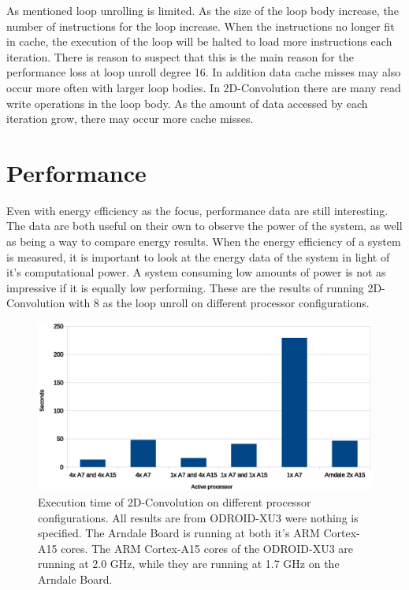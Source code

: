 As mentioned loop unrolling is limited.
As the size of the loop body increase, the number of instructions for the loop increase.
When the instructions no longer fit in cache, the execution of the loop will be halted to load more instructions each iteration.
There is reason to suspect that this is the main reason for the performance loss at loop unroll degree 16.
In addition data cache misses may also occur more often with larger loop bodies.
In 2D-Convolution there are many read write operations in the loop body.
As the amount of data accessed by each iteration grow, there may occur more cache misses.

\section{Performance}
Even with energy efficiency as the focus, performance data are still interesting.
The data are both useful on their own to observe the power of the system, as well as being a way to compare energy results.
When the energy efficiency of a system is measured, it is important to look at the energy data of the system in light of it's computational power.
A system consuming low amounts of power is not as impressive if it is equally low performing.
These are the results of running 2D-Convolution with 8 as the loop unroll on different processor configurations.

\begin{figure}[H]
  \centering
  \includegraphics[width=160mm]{fig/execution-time-configurations.eps}
  \caption{Execution time of 2D-Convolution on different processor configurations. All results are from ODROID-XU3 were nothing is specified. The Arndale Board is running at both it's ARM Cortex-A15 cores. The ARM Cortex-A15 cores of the ODROID-XU3 are running at 2.0 GHz, while they are running at 1.7 GHz on the Arndale Board. \label{overflow}}
\end{figure}

